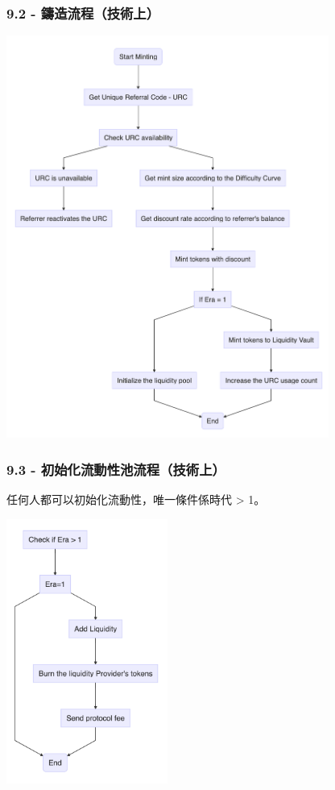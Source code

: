 \documentclass[
]{article}
\begin{document}
\subsubsection{9.2 -
鑄造流程（技術上）}\label{ux9444ux9020ux6d41ux7a0bux6280ux8853ux4e0a}

\includegraphics[width=400px]{mint_workflow}

\subsubsection{9.3 -
初始化流動性池流程（技術上）}\label{ux521dux59cbux5316ux6d41ux52d5ux6027ux6c60ux6d41ux7a0bux6280ux8853ux4e0a}

任何人都可以初始化流動性，唯一條件係時代 \textgreater{} 1。

\includegraphics[width=200px]{initialize_liquidity_workflow}
\end{document}
